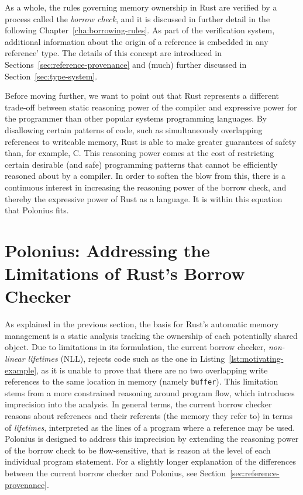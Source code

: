\documentclass[11pt,a4paper,twoside,openany,draft]{report}
\newcommand{\InRust}[1]{\texttt{#1}}
\begin{document}
As a whole, the rules governing memory ownership in Rust are verified by a
process called the \textit{borrow check}, and it is discussed in further detail
in the following Chapter~\ref{cha:borrowing-rules}. As part of the verification
system, additional information about the origin of a reference is embedded in
any reference' type. The details of this concept are introduced in
Sections~\ref{sec:reference-provenance} and (much) further discussed in
Section~\ref{sec:type-system}.

Before moving further, we want to point out that Rust represents a different
trade-off between static reasoning power of the compiler and expressive power
for the programmer than other popular systems programming languages. By
disallowing certain patterns of code, such as simultaneously overlapping
references to writeable memory, Rust is able to make greater guarantees of
safety than, for example, C. This reasoning power comes at the cost of
restricting certain desirable (and safe) programming patterns that cannot be
efficiently reasoned about by a compiler. In order to soften the blow from this,
there is a continuous interest in increasing the reasoning power of the borrow
check, and thereby the expressive power of Rust as a language. It is within this
equation that Polonius fits.

\section{Polonius: Addressing the Limitations of Rust's Borrow
  Checker}\label{sec:limitations}

As explained in the previous section, the basis for Rust's automatic memory
management is a static analysis tracking the ownership of each potentially
shared object. Due to limitations in its formulation, the current borrow
checker, \textit{non-linear lifetimes} (NLL), rejects code such as the one in
Listing~\ref{lst:motivating-example}, as it is unable to prove that there are no
two overlapping write references to the same location in memory (namely
\InRust{buffer}). This limitation stems from a more constrained reasoning around
program flow, which introduces imprecision into the analysis. In general terms,
the current borrow checker reasons about references and their referents (the
memory they refer to) in terms of \textit{lifetimes}, interpreted as the lines
of a program where a reference may be used. Polonius is designed to address this
imprecision by extending the reasoning power of the borrow check to be
flow-sensitive, that is reason at the level of each individual program
statement. For a slightly longer explanation of the differences between the
current borrow checker and Polonius, see Section~\ref{sec:reference-provenance}.
\end{document}
